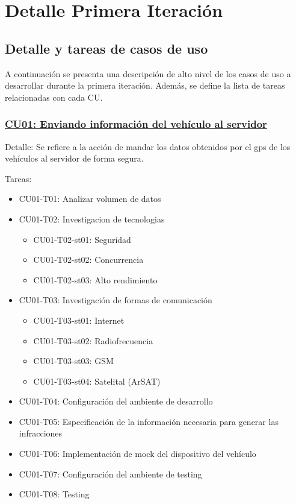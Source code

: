 \section{Detalle Primera Iteración}

\subsection{Detalle y tareas de casos de uso}

A continuación se presenta una descripción de alto nivel de los casos de uso a 
desarrollar durante la primera iteración. Además, se define la lista de tareas 
relacionadas con cada CU.

\subsubsection{\underline{CU01: Enviando información del vehículo al servidor}}

Detalle: Se refiere a la acción de mandar los datos obtenidos por el gps de los 
vehículos al servidor de forma segura.


Tareas: 
\begin{itemize}

\item CU01-T01: Analizar volumen de datos

\item CU01-T02: Investigacion de tecnologias
\begin{itemize}
\item CU01-T02-st01: Seguridad
\item CU01-T02-st02: Concurrencia
\item CU01-T02-st03: Alto rendimiento
\end{itemize}

\item CU01-T03: Investigación de formas de comunicación
\begin{itemize}
\item CU01-T03-st01: Internet
\item CU01-T03-st02: Radiofrecuencia
\item CU01-T03-st03: GSM
\item CU01-T03-st04: Satelital (ArSAT)
\end{itemize}

\item CU01-T04: Configuración del ambiente de desarrollo 
\item CU01-T05: Especificación de la información necesaria para generar las infracciones 
\item CU01-T06: Implementación de mock del dispositivo del vehículo 
\item CU01-T07: Configuración del ambiente de testing 
\item CU01-T08: Testing 

\end{itemize}


